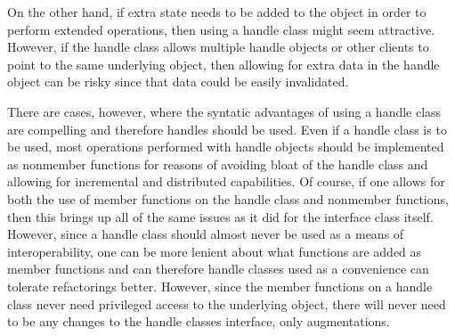 \documentclass[pdf,ps2pdf,11pt]{SANDreport}
\begin{document}
On the other hand, if extra state needs to be added to the object in order to
perform extended operations, then using a handle class might seem attractive.
However, if the handle class allows multiple handle objects or other clients
to point to the same underlying object, then allowing for extra data in the
handle object can be risky since that data could be easily invalidated.

There are cases, however, where the syntatic advantages of using a handle
class are compelling and therefore handles should be used.  Even if a handle
class is to be used, most operations performed with handle objects should be
implemented as nonmember functions for reasons of avoiding bloat of the handle
class and allowing for incremental and distributed capabilities.  Of course,
if one allows for both the use of member functions on the handle class and
nonmember functions, then this brings up all of the same issues as it did for
the interface class itself.  However, since a handle class should almost never
be used as a means of interoperability, one can be more lenient about what
functions are added as member functions and can therefore handle classes used
as a convenience can tolerate refactorings better.  However, since the member
functions on a handle class never need privileged access to the underlying
object, there will never need to be any changes to the handle classes
interface, only augmentations.

%
\clearpage



%
%

\end{document}
